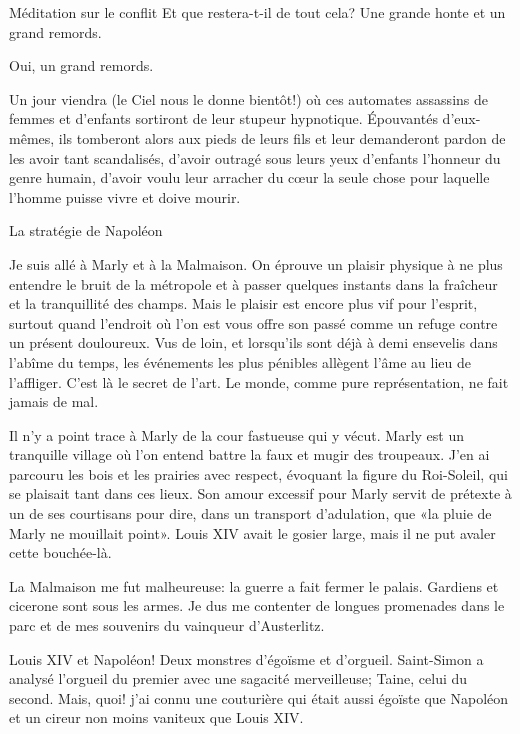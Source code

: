 \begin{chapter}{Méditation sur le conflit}
Et que restera-t-il de tout cela? Une grande honte et un grand remords.

Oui, un grand remords.

Un jour viendra (le Ciel nous le donne bientôt!) où ces automates
assassins de femmes et d'enfants sortiront de leur stupeur hypnotique.
Épouvantés d'eux-mêmes, ils tomberont alors aux pieds de leurs fils et
leur demanderont pardon de les avoir tant scandalisés, d'avoir outragé
sous leurs yeux d'enfants l'honneur du genre humain, d'avoir voulu leur
arracher du cœur la seule chose pour laquelle l'homme puisse vivre et
doive mourir.

\end{chapter}


\begin{chapter}{La stratégie de Napoléon}

Je suis allé à Marly et à la Malmaison. On éprouve un plaisir physique à
ne plus entendre le bruit de la métropole et à passer quelques instants
dans la fraîcheur et la tranquillité des champs. Mais le plaisir est
encore plus vif pour l'esprit, surtout quand l'endroit où l'on est vous
offre son passé comme un refuge contre un présent douloureux. Vus de
loin, et lorsqu'ils sont déjà à demi ensevelis dans l'abîme du temps,
les événements les plus pénibles allègent l'âme au lieu de l'affliger.
C'est là le secret de l'art. Le monde, comme pure représentation, ne
fait jamais de mal.

Il n'y a point trace à Marly de la cour fastueuse qui y vécut. Marly est
un tranquille village où l'on entend battre la faux et mugir des
troupeaux. J'en ai parcouru les bois et les prairies avec respect,
évoquant la figure du Roi-Soleil, qui se plaisait tant dans ces lieux.
Son amour excessif pour Marly servit de prétexte à un de ses courtisans
pour dire, dans un transport d'adulation, que «la pluie de Marly ne
mouillait point». Louis XIV avait le gosier large, mais il ne put avaler
cette bouchée-là.

La Malmaison me fut malheureuse: la guerre a fait fermer le palais.
Gardiens et cicerone sont sous les armes. Je dus me contenter de longues
promenades dans le parc et de mes souvenirs du vainqueur d'Austerlitz.

Louis XIV et Napoléon! Deux monstres d'égoïsme et d'orgueil. Saint-Simon
a analysé l'orgueil du premier avec une sagacité merveilleuse; Taine,
celui du second. Mais, quoi! j'ai connu une couturière qui était aussi
égoïste que Napoléon et un cireur non moins vaniteux que Louis XIV.


\end{chapter}
